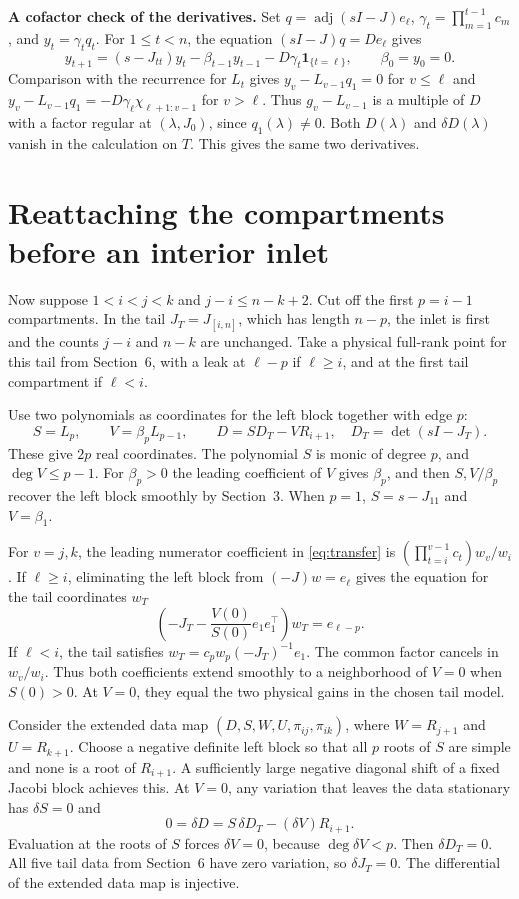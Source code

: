 \documentclass[11pt,a4paper]{article}
\newcommand{\ind}{\mathbf{1}}
\newcommand{\sect}[1]{\section{#1}}
\begin{document}
\noindent\textbf{A cofactor check of the derivatives.}
Set \(q=\operatorname{adj}(sI-J)e_\ell\), \(\gamma_t=\prod_{m=1}^{t-1}c_m\), and \(y_t=\gamma_t q_t\). For \(1\le t<n\), the equation \((sI-J)q=D e_\ell\) gives
\[
 y_{t+1}=(s-J_{tt})y_t-\beta_{t-1}y_{t-1}-D\gamma_t\ind_{\{t=\ell\}},
 \qquad \beta_0=y_0=0 .
\]
Comparison with the recurrence for \(L_t\) gives \(y_v-L_{v-1}q_1=0\) for \(v\le\ell\) and \(y_v-L_{v-1}q_1=-D\gamma_\ell\chi_{\ell+1:v-1}\) for \(v>\ell\). Thus \(g_v-L_{v-1}\) is a multiple of \(D\) with a factor regular at \((\lambda,J_0)\), since \(q_1(\lambda)\ne0\). Both \(D(\lambda)\) and \(\delta D(\lambda)\) vanish in the calculation on \(T\). This gives the same two derivatives.


\sect{Reattaching the compartments before an interior inlet}
Now suppose \(1<i<j<k\) and \(j-i\le n-k+2\). Cut off the first \(p=i-1\) compartments. In the tail \(J_T=J_{[i,n]}\), which has length \(n-p\), the inlet is first and the counts \(j-i\) and \(n-k\) are unchanged. Take a physical full-rank point for this tail from Section~6, with a leak at \(\ell-p\) if \(\ell\ge i\), and at the first tail compartment if \(\ell<i\).

Use two polynomials as coordinates for the left block together with edge \(p\):
\[
     S=L_p,\qquad V=\beta_p L_{p-1},\qquad
     D=S D_T - V R_{i+1},\quad D_T=\det(sI-J_T).
\]
These give \(2p\) real coordinates. The polynomial \(S\) is monic of degree \(p\), and \(\deg V\le p-1\). For \(\beta_p>0\) the leading coefficient of \(V\) gives \(\beta_p\), and then \(S,V/\beta_p\) recover the left block smoothly by Section~3. When \(p=1\), \(S=s-J_{11}\) and \(V=\beta_1\).

For \(v=j,k\), the leading numerator coefficient in \eqref{eq:transfer} is \((\prod_{t=i}^{v-1}c_t)w_v/w_i\). If \(\ell\ge i\), eliminating the left block from \((-J)w=e_\ell\) gives the equation for the tail coordinates \(w_T\)
\[
 \left(-J_T-\frac{V(0)}{S(0)}e_1e_1^\top\right)w_T=e_{\ell-p}.
\]
If \(\ell<i\), the tail satisfies \(w_T=c_p w_p(-J_T)^{-1}e_1\). The common factor cancels in \(w_v/w_i\). Thus both coefficients extend smoothly to a neighborhood of \(V=0\) when \(S(0)>0\). At \(V=0\), they equal the two physical gains in the chosen tail model.

Consider the extended data map \((D,S,W,U,\pi_{ij},\pi_{ik})\), where \(W=R_{j+1}\) and \(U=R_{k+1}\). Choose a negative definite left block so that all \(p\) roots of \(S\) are simple and none is a root of \(R_{i+1}\). A sufficiently large negative diagonal shift of a fixed Jacobi block achieves this. At \(V=0\), any variation that leaves the data stationary has \(\delta S=0\) and
\[
                 0=\delta D=S\,\delta D_T -(\delta V)R_{i+1}.
\]
Evaluation at the roots of \(S\) forces \(\delta V=0\), because \(\deg\delta V<p\). Then \(\delta D_T=0\). All five tail data from Section~6 have zero variation, so \(\delta J_T=0\). The differential of the extended data map is injective.
\end{document}
